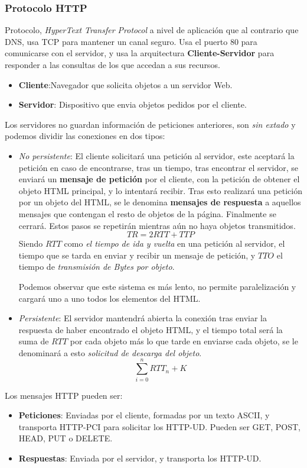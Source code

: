 \subsubsection{Protocolo HTTP}
\noindent Protocolo, \textit{HyperText Transfer Protocol} a nivel de aplicación que al contrario que DNS, usa TCP para mantener un canal seguro. Usa el puerto 80 para comunicarse con el servidor, y usa la arquitectura \textbf{Cliente-Servidor} para responder a las consultas de los que accedan a sus recursos.
\begin{itemize}
        \item \textbf{Cliente}:Navegador que solicita objetos a un servidor Web.
        \item \textbf{Servidor}: Dispositivo que envia objetos pedidos por el cliente.
\end{itemize}
\noindent Los servidores no guardan información de peticiones anteriores, son \textit{sin extado} y podemos dividir las conexiones en dos tipos:
\begin{itemize}
        \item \textit{No persistente}: El cliente solicitará una petición al servidor, este aceptará la petición en caso de encontrarse, tras un tiempo, tras encontrar el servidor, se enviará un \textbf{mensaje de petición} por el cliente, con la petición de obtener el objeto HTML principal, y lo intentará recibir. Tras esto realizará una petición por un objeto del HTML, se le denomina \textbf{mensajes de respuesta} a aquellos mensajes que contengan el resto de objetos de la página. Finalmente se cerrará. Estos pasos se repetirán mientras aún no haya objetos transmitidos.
              \[
                      \boxed{TR = 2 RTT + TTP}
              \]
              \noindent Siendo \(RTT\) como \textit{el tiempo de ida y vuelta} en una petición al servidor, el tiempo que se tarda en enviar y recibir un mensaje de petición, y \(TTO\) el tiempo de \textit{transmisión de Bytes por objeto}.
              \par \noindent Podemos observar que este sistema es más lento, no permite paralelización y cargará uno a uno todos los elementos del HTML.
        \item \textit{Persistente}: El servidor mantendrá abierta la conexión tras enviar la respuesta de haber encontrado el objeto HTML, y el tiempo total será la suma de \(RTT\) por cada objeto más lo que tarde en enviarse cada objeto, se le denominará a esto \textit{solicitud de descarga del objeto}.
              \[
                      \boxed{\sum^n_{i=0}RTT_n + K}
              \]
\end{itemize}
\noindent Los mensajes HTTP pueden ser:
\begin{itemize}
        \item \textbf{Peticiones}: Enviadas por el cliente, formadas por un texto ASCII, y transporta HTTP-PCI para solicitar los HTTP-UD. Pueden ser GET, POST, HEAD, PUT o DELETE.
        \item \textbf{Respuestas}: Enviada por el servidor, y transporta los HTTP-UD.
\end{itemize}
